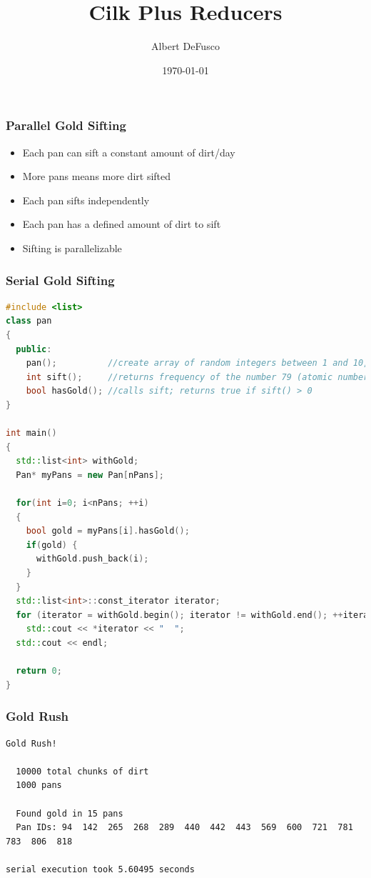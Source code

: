 \documentclass[fleqn,xcolor=table,10pt,final]{beamer}
\begin{document}
\title{Cilk Plus Reducers}
\author{Albert DeFusco}
\date{\today}
\frame{\titlepage}


\begin{frame}
  \frametitle{Parallel Gold Sifting}
  \begin{itemize}
    \item Each pan can sift a constant amount of dirt/day
    \item More pans means more dirt sifted
  \end{itemize}
  \vskip 0.2cm
  \begin{itemize}
    \item<2-> Each pan sifts independently
    \item<2-> Each pan has a defined amount of dirt to sift
  \end{itemize}
  \vskip 0.2cm
  \begin{itemize}
    \item<3-> Sifting is parallelizable
  \end{itemize}
\end{frame}

\begin{frame}[fragile]
  \frametitle{Serial Gold Sifting}
  \begin{lstlisting}[language=C++,basicstyle=\scriptsize]
#include <list>
class pan
{
  public:
    pan();          //create array of random integers between 1 and 10,000
    int sift();     //returns frequency of the number 79 (atomic number of gold)
    bool hasGold(); //calls sift; returns true if sift() > 0
}

int main()
{
  std::list<int> withGold;
  Pan* myPans = new Pan[nPans];

  for(int i=0; i<nPans; ++i)
  {
    bool gold = myPans[i].hasGold();
    if(gold) {
      withGold.push_back(i);
    }
  }
  std::list<int>::const_iterator iterator;
  for (iterator = withGold.begin(); iterator != withGold.end(); ++iterator)
    std::cout << *iterator << "  ";
  std::cout << endl;

  return 0;
}
  \end{lstlisting}
\end{frame}

\begin{frame}[fragile]
  \frametitle{Gold Rush}
  {\scriptsize
  \begin{verbatim}
Gold Rush!

  10000 total chunks of dirt
  1000 pans

  Found gold in 15 pans
  Pan IDs: 94  142  265  268  289  440  442  443  569  600  721  781  783  806  818

serial execution took 5.60495 seconds
  \end{verbatim}
}
\end{frame}
\end{document}
